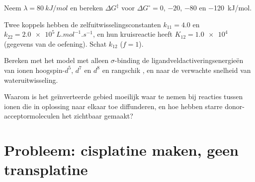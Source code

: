 \begin{exercise}[$\star\star$]\label{exo:b3:complex-mechanisms:9}
Neem $\lambda = \qty{80}{kJ/mol}$ en bereken $\Delta G^{\ddagger}$ voor $\Delta G^\circ = 0$, $-20$, $-80$ en \qty{-120}{kJ/mol}.
\end{exercise}

\begin{exercise}[$\star\star\star$]\label{exo:b3:complex-mechanisms:10}
Twee koppels hebben de zelfuitwisselingsconstanten $k_{11} = 4.0$ en $k_{22} = \qty{2.0e5}{L.mol^{-1}.s^{-1}}$, en
hun kruisreactie heeft $K_{12} = \num{1.0e4}$ (gegevens van de oefening). Schat $k_{12}$ ($f = 1$).
\end{exercise}

\begin{exercise}[$\star\star\star$]\label{exo:b3:complex-mechanisms:11}
Bereken met het model met alleen $\sigma$-binding de
ligandveldactiveringsenergieën van ionen hoogspin-$d^5$, $d^7$ en $d^8$ en rangschik ,  en  naar
de verwachte snelheid van wateruitwisseling.
\end{exercise}

\begin{exercise}[$\star\star\star$]\label{exo:b3:complex-mechanisms:12}
Waarom is het geïnverteerde gebied moeilijk waar te nemen bij reacties
tussen ionen die in oplossing naar elkaar toe diffunderen, en hoe hebben
starre donor-acceptormoleculen het zichtbaar gemaakt?
\end{exercise}

\section{Probleem: cisplatine maken, geen transplatine}

